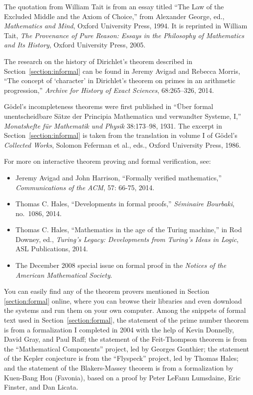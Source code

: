 \documentclass[11pt]{article}
\begin{document}
The quotation from William Tait is from an essay titled ``The Law of the Excluded Middle and the Axiom of Choice,'' from Alexander George, ed., \emph{Mathematics and Mind}, Oxford University Press, 1994. It is reprinted in William Tait, \emph{The Provenance of Pure Reason: Essays in the Philosophy of Mathematics and Its History}, Oxford University Press, 2005.

The research on the history of Dirichlet's theorem described in Section~\ref{section:informal} can be found in Jeremy Avigad and Rebecca Morris, ``The concept of `character' in Dirichlet’s theorem on primes in an arithmetic progression,'' \emph{Archive for History of Exact Sciences}, 68:265--326, 2014.

G\"odel's incompleteness theorems were first published in ``\"Uber formal unentscheidbare S\"atze der Principia Mathematica und verwandter Systeme, I,'' \emph{Monatshefte f\"ur Mathematik und Physik} 38:173--98, 1931. The excerpt in Section~\ref{section:informal} is taken from the translation in volume I of G\"odel's \emph{Collected Works}, Solomon Feferman et al., eds., Oxford University Press, 1986.

For more on interactive theorem proving and formal verification, see:
\begin{itemize}
 \item Jeremy Avigad and John Harrison, ``Formally verified mathematics,'' \emph{Communications of the ACM}, 57: 66-75, 2014.
 \item Thomas C. Hales, ``Developments in formal proofs,'' \emph{S\'eminaire Bourbaki}, no.~1086, 2014.
 \item Thomas C. Hales, ``Mathematics in the age of the Turing machine,'' in Rod Downey, ed., \emph{Turing's Legacy: Developments from Turing's Ideas in Logic}, ASL Publications, 2014.
 \item The December 2008 special issue on formal proof in the \emph{Notices of the American Mathematical Society}.
\end{itemize}
You can easily find any of the theorem provers mentioned in Section \ref{section:formal} online, where you can browse their libraries and even download the systems and run them on your own computer. Among the snippets of formal text used in Section~\ref{section:formal}, the statement of the prime number theorem is from a formalization I completed in 2004 with the help of Kevin Donnelly, David Gray, and Paul Raff; the statement of the Feit-Thompson theorem is from the ``Mathematical Components'' project, led by Georges Gonthier; the statement of the Kepler conjecture is from the ``Flyspeck'' project, led by Thomas Hales; and the statement of the Blakers-Massey theorem is from a formalization by Kuen-Bang Hou (Favonia), based on a proof by Peter LeFanu Lumsdaine, Eric Finster, and Dan Licata.
\end{document}
